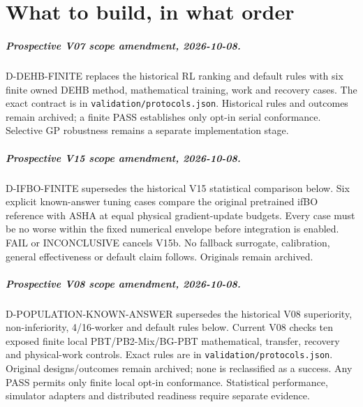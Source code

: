 \chapter{What to build, in what order}
\label{sec:roadmap}

\paragraph{Prospective V07 scope amendment, 2026-10-08.}
D-DEHB-FINITE replaces the historical RL ranking and default rules with six
finite owned DEHB method, mathematical training, work and recovery cases.
The exact contract is in \texttt{validation/protocols.json}. Historical rules
and outcomes remain archived; a finite PASS establishes only opt-in serial
conformance. Selective GP robustness remains a separate implementation stage.


\paragraph{Prospective V15 scope amendment, 2026-10-08.}
D-IFBO-FINITE supersedes the historical V15 statistical comparison below.
Six explicit known-answer tuning cases compare the original pretrained ifBO
reference with ASHA at equal physical gradient-update budgets. Every case must
be no worse within the fixed numerical envelope before integration is enabled.
FAIL or INCONCLUSIVE cancels V15b. No fallback surrogate, calibration, general
effectiveness or default claim follows. Originals remain archived.


\paragraph{Prospective V08 scope amendment, 2026-10-08.}
D-POPULATION-KNOWN-ANSWER supersedes the historical V08 superiority,
non-inferiority, 4/16-worker and default rules below. Current V08 checks ten
exposed finite local PBT/PB2-Mix/BG-PBT mathematical, transfer, recovery and
physical-work controls. Exact rules are in \texttt{validation/protocols.json}.
Original designs/outcomes remain archived; none is reclassified as a success.
Any PASS permits only finite local opt-in conformance. Statistical performance,
simulator adapters and distributed readiness require separate evidence.


